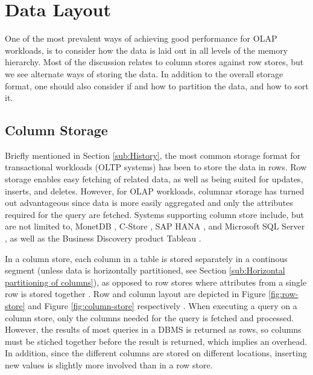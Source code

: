 \chapter{Data Layout}
\label{chap:Data Layout}
One of the most prevalent ways of achieving good performance for OLAP workloads, is to consider how the data is laid out in all levels of the memory hierarchy. Most of the discussion relates to column stores against row stores, but we see alternate ways of storing the data. In addition to the overall storage format, one should also consider if and how to partition the data, and how to sort it.
\newpage

\section{Column Storage}
\label{sec:Column Storage}
Briefly mentioned in Section \ref{sub:History}, the most common storage format for transactional workloads (OLTP systems) has been to store the data in rows. Row storage enables easy fetching of related data, as well as being suited for updates, inserts, and deletes. However, for OLAP workloads, columnar storage has turned out advantageous since data is more easily aggregated and only the attributes required for the query are fetched. Systems supporting column store include, but are not limited to, MonetDB \cite{Boncz2002-yj, Boncz2005-wj}, C-Store \cite{Stonebraker2005-qz}, SAP HANA \cite{Farber2012-vh}, and Microsoft SQL Server \cite{Larson2013-mc, noauthor_undated-vq}, as well as the Business Discovery product Tableau \cite{Kamkolkar2015-iq}. 

In a column store, each column in a table is stored separately in a continous segment (unless data is horizontally partitioned, see Section \ref{sub:Horizontal partitioning of columns}), as opposed to row stores where attributes from a single row is stored together \cite{Bjorklund2011-wh}. Row and column layout are depicted in Figure \ref{fig:row-store} and Figure \ref{fig:column-store} respectively . When executing a query on a column store, only the columns needed for the query is fetched and processed. However, the results of most queries in a DBMS is returned as rows, so columns must be stiched together before the result is returned, which implies an overhead. In addition, since the different columns are stored on different locations, inserting new values is slightly more involved than in a row store. 

